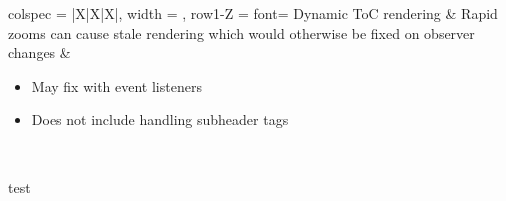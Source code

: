 \documentclass[7px]{article}
\begin{document}
{
  \raggedright
  \begin{tblr}{
      colspec = {|X|X|X|}, width = \linewidth,
      row{1-Z} = {font=\scriptsize}
    }
    Dynamic ToC rendering & {Rapid zooms can cause stale rendering which would otherwise be fixed on observer changes} & {
      \begin{itemize}
        \item May fix with event listeners
        \item Does not include handling subheader tags
      \end{itemize}
    } \\
  \end{tblr}
  \noindent test
}

\end{document}
